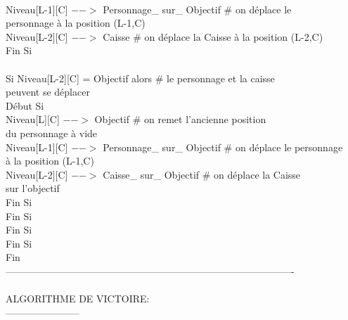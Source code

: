 \documentclass{article}
\begin{document}
\begin{tabbing}
\\	\hspace{5cm}				Niveau[L-1][C] $-->$ Personnage\_ sur\_ Objectif	\# on déplace le
\\ \hspace{5cm} personnage à la position (L-1,C)
\\	\hspace{5cm}				Niveau[L-2][C] $-->$ Caisse			\# on déplace la Caisse à la position (L-2,C)
\\	\hspace{4cm}			Fin Si
\\
\\	\hspace{4cm}			Si Niveau[L-2][C] = Objectif alors         		\# le personnage et la caisse
\\ \hspace{4cm} peuvent se déplacer
\\	\hspace{4cm}			Début Si
\\	\hspace{5cm}				Niveau[L][C] $-->$ Objectif 			\# on remet l'ancienne position
\\ \hspace{5cm} du personnage à vide
\\	\hspace{5cm}				Niveau[L-1][C] $-->$ Personnage\_ sur\_ Objectif	\# on déplace le personnage
\\ \hspace{5cm} à la position (L-1,C)
\\	\hspace{5cm}				Niveau[L-2][C] $-->$ Caisse\_ sur\_ Objectif		\# on déplace la Caisse
\\ \hspace{5cm} sur l'objectif
\\	\hspace{4cm}			Fin Si
\\	\hspace{3cm}		Fin Si 
\\	\hspace{2cm}	Fin Si 
\\	\hspace{1cm} Fin Si
\\Fin 
\\----------------------------------------------------------------------------------------
\\
\\ALGORITHME DE VICTOIRE:
\\-----------------------

\end{tabbing}
\end{document}
